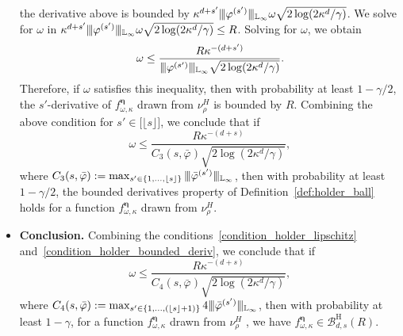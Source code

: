 \documentclass[twoside,11pt]{article}
\newcommand{\floor}[1]{\lfloor #1 \rfloor} %
\newcommand{\dimDensity}{d} %
\newcommand{\smoothness}{s}
\newcommand{\ballRadius}{R}
\newcommand{\binNum}{\kappa}           %
\newcommand{\ballDistn}{\mathcal{B}}
\newcommand{\holderBall}{\ballDistn_{\dimDensity, \smoothness}^{\mathrm{H}}(\ballRadius)} %
\begin{document}
\begin{appendix}
\begin{itemize}
	the derivative above is bounded by $\kappa^{\dimDensity + s'}
	\vert\kern-0.25ex
	\vert\kern-0.25ex
	\vert
	\varphi^{(s')}
	\vert\kern-0.25ex
	\vert\kern-0.25ex
	\vert_{\mathbb{L}_\infty}
	\omega \sqrt{2\log(2{\binNum^{\dimDensity}}/\gamma)}$.
	We solve for \(\omega\) in
	$\kappa^{\dimDensity + s'}
	\vert\kern-0.25ex
	\vert\kern-0.25ex
	\vert
	\varphi^{(s')}
	\vert\kern-0.25ex
	\vert\kern-0.25ex
	\vert_{\mathbb{L}_\infty}
	\omega \sqrt{2\log(2{\binNum^{\dimDensity}}/\gamma)} \leq \ballRadius$. Solving for $\omega$, we obtain
	\begin{equation}
		\omega
		\leq
		\frac{R\kappa^{-(\dimDensity+s')}}
		{
			\vert\kern-0.25ex
			\vert\kern-0.25ex
			\vert
			\varphi^{(s')}
			\vert\kern-0.25ex
			\vert\kern-0.25ex
			\vert_{\mathbb{L}_\infty}
			\sqrt{2\log(2{\binNum^{\dimDensity}}/\gamma)}
		}.
	\end{equation}
	\noindent
	Therefore, if \(\omega\) satisfies this inequality, then with probability at least \(1 - \gamma/2\), the $s'$-derivative of  \(f^{{\boldsymbol{\eta}}}_{\omega, \binNum}\) drawn from \(\nu_\rho^H\) is bounded by $\ballRadius$.
	Combining the above condition for  $s' \in \bigl[ \lfloor \smoothness \rfloor \bigr]$, 
	we conclude that if
	\begin{equation}\label{condition_holder_bounded_deriv}
		\omega \leq \frac{R\kappa^{-(\dimDensity+s)}
		}{
			C_3(\smoothness, \bar{\varphi}) 
			\sqrt{2 \log({2\binNum^{\dimDensity}}/\gamma)}},	
	\end{equation}
	where $C_3(\smoothness, \bar{\varphi}) := \max_{s' \in \{1, \ldots, \floor{s} \}}
	\vert\kern-0.25ex
	\vert\kern-0.25ex
	\vert
	\bar{\varphi}^{(s')}
	\vert\kern-0.25ex
	\vert\kern-0.25ex
	\vert_{\mathbb{L}_\infty}
	$,
	then with probability at least \(1 - \gamma/2\), the bounded derivatives property of Definition~\ref{def:holder_ball} holds for a function \(f^{{\boldsymbol{\eta}}}_{\omega, \binNum}\) drawn from \(\nu_\rho^H\).
	\item \textbf{Conclusion.} Combining the conditions~\eqref{condition_holder_lipschitz} and~\eqref{condition_holder_bounded_deriv}, we conclude that if
	\begin{equation}
		\omega \leq \frac{R\kappa^{-(\dimDensity+s)}
		}{
			C_4(\smoothness, \bar{\varphi}) 
			\sqrt{2 \log({2\binNum^{\dimDensity}}/\gamma)}},  
	\end{equation}
	where
	$C_4(\smoothness, \bar{\varphi})  := 
	\max_{s' \in \{1, \ldots, (\floor{s}+1) \}}
	4\vert\kern-0.25ex
	\vert\kern-0.25ex
	\vert
	\bar{\varphi}^{(s')}
	\vert\kern-0.25ex
	\vert\kern-0.25ex
	\vert_{\mathbb{L}_\infty}
	$,
	then with probability at least \(1 - \gamma\),
	for a function \(f^{{\boldsymbol{\eta}}}_{\omega, \binNum}\) drawn from \(\nu_\rho^H\) , we have
	$f^{{\boldsymbol{\eta}}}_{\omega, \binNum} \in \holderBall$.
\end{itemize}

\end{appendix}
\end{document}
